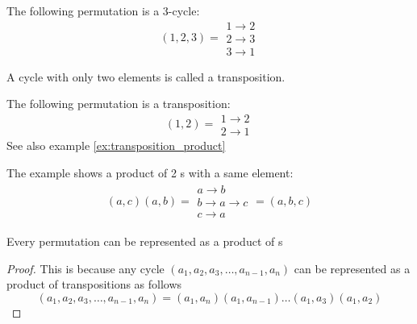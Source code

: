\begin{appendices}
\begin{example}[Cycle]
  The following permutation is a 3-cycle:
  \[
  (1,2,3) = \begin{array}{c}
                1 \to 2 \\
                2 \to 3 \\
                3 \to 1 
              \end{array}
  \]
  \label{ex:cycle}
\end{example}

\begin{definition}[Transposition]
  A cycle with only two elements is called a transposition.
  \cite{wiki:cyclicpermutation}
  \label{def:transposition}
\end{definition}

\begin{example}[Transposition]
  The following permutation is a transposition:
  \[
  (1,2) = \begin{array}{c}
                1 \to 2 \\
                2 \to 1 
              \end{array}
  \]
  \label{ex:transposition}
  See also example \ref{ex:transposition_product}
\end{example}

\begin{example}
  \label{ex:transposition_product}
  The example shows a product of 2 s with a
  same element:
  \begin{eqnarray}
    (a,c)(a,b) = 
    \begin{array}{c}
      a \to b \\
      b \to a \to c\\
      c \to a 
    \end{array} = (a,b,c)
    \nonumber
  \end{eqnarray}
\end{example}


\begin{theorem}
  Every permutation can be represented as a product of
  s
  \begin{proof}
    This is because any cycle $(a_1, a_2, a_3, \dots, a_{n-1}, a_n)$
    can be represented as a product of transpositions as follows
    \[
    (a_1, a_2, a_3, \dots, a_{n-1}, a_n) =
    (a_1, a_n)(a_1, a_{n-1}) \dots (a_1, a_3) (a_1, a_2)
    \]
  \end{proof}
  \label{thm:permutationrepresent}
\end{theorem}


\end{appendices}
